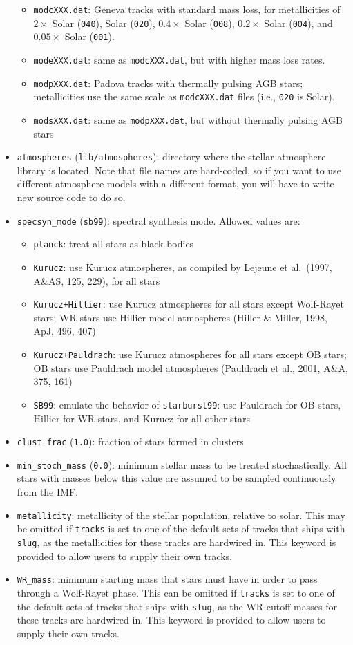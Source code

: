\documentclass[12pt]{article}
\newcommand{\slug}{\texttt{slug}}
\begin{document}
\begin{itemize}
\begin{itemize}
\item \verb=modcXXX.dat=: Geneva tracks with standard mass loss, for metallicities of $2\times$ Solar (\verb=040=), Solar (\verb=020=), $0.4\times$ Solar (\verb=008=), $0.2\times$ Solar (\verb=004=), and $0.05\times$ Solar (\verb=001=).
\item \verb=modeXXX.dat=: same as \verb=modcXXX.dat=, but with higher mass loss rates.
\item \verb=modpXXX.dat=: Padova tracks with thermally pulsing AGB stars; metallicities use the same scale as \verb=modcXXX.dat= files (i.e., \verb=020= is Solar).
\item \verb=modsXXX.dat=: same as \verb=modpXXX.dat=, but without thermally pulsing AGB stars
\end{itemize}
\item \verb=atmospheres= (\verb=lib/atmospheres=): directory where the stellar atmosphere library is located. Note that file names are hard-coded, so if you want to use different atmosphere models with a different format, you will have to write new source code to do so.
\item \verb=specsyn_mode= (\verb=sb99=): spectral synthesis mode. Allowed values are:
\begin{itemize}
\item \verb=planck=: treat all stars as black bodies
\item \verb=Kurucz=: use Kurucz atmospheres, as compiled by Lejeune et al.~(1997, A\&AS, 125, 229), for all stars
\item \verb=Kurucz+Hillier=: use Kurucz atmospheres for all stars except Wolf-Rayet stars; WR stars use Hillier model atmospheres (Hiller \& Miller, 1998, ApJ, 496, 407)
\item \verb=Kurucz+Pauldrach=: use Kurucz atmospheres for all stars except OB stars; OB stars use Pauldrach model atmospheres (Pauldrach et al., 2001, A\&A, 375, 161)
\item \verb=SB99=: emulate the behavior of \verb=starburst99=: use Pauldrach for OB stars, Hillier for WR stars, and Kurucz for all other stars
\end{itemize}
\item \verb=clust_frac= (\verb=1.0=): fraction of stars formed in clusters
\item \verb=min_stoch_mass= (\verb=0.0=): minimum stellar mass to be treated stochastically. All stars with masses below this value are assumed to be sampled continuously from the IMF.
\item \verb=metallicity=: metallicity of the stellar population, relative to solar. This may be omitted if \verb=tracks= is set to one of the default sets of tracks that ships with \slug, as the metallicities for these tracks are hardwired in. This keyword is provided to allow users to supply their own tracks.
\item \verb=WR_mass=: minimum starting mass that stars must have in order to pass through a Wolf-Rayet phase. This can be omitted if \verb=tracks= is set to one of the default sets of tracks that ships with \slug, as the WR cutoff masses for these tracks are hardwired in. This keyword is provided to allow users to supply their own tracks.
\end{itemize}
\end{document}

